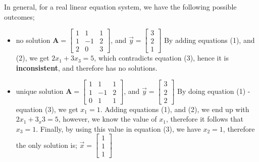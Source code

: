 \documentclass[a4paper, 12pt]{article}
\begin{document}
                In general, for a real linear equation system, we have the following possible outcomes;
                \begin{itemize}
                    \itemsep0em
                    \item no solution
                        \subitem $\mathbf{A} = \begin{bmatrix}
                            1 & 1 & 1 \\
                            1 & -1 & 2 \\
                            2 & 0 & 3
                        \end{bmatrix}$, and $\vec{y} = \begin{bmatrix}
                            3 \\
                            2 \\
                            1
                        \end{bmatrix}$
                        \subitem By adding equations (1), and (2), we get $2x_1 + 3x_3 = 5$, which contradicts equation (3), hence it is \textbf{inconsistent}, and therefore has no solutions.
                    \item unique solution
                        \subitem $\mathbf{A} = \begin{bmatrix}
                            1 & 1 & 1 \\
                            1 & -1 & 2 \\
                            0 & 1 & 1
                        \end{bmatrix}$, and $\vec{y} = \begin{bmatrix}
                            3 \\
                            2 \\
                            2
                        \end{bmatrix}$
                        \subitem By doing equation (1) - equation (3), we get $x_1 = 1$. Adding equations (1), and (2), we end up with $2x_1 + 3_x3 = 5$, however, we know the value of $x_1$, therefore it follows that $x_3 = 1$. Finally, by using this value in equation (3), we have $x_2 = 1$, therefore the only solution is;
                        \subitem $\vec{x} = \begin{bmatrix}
                            1 \\
                            1 \\
                            1
                        \end{bmatrix}$

\end{itemize}
\end{document}
